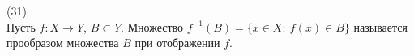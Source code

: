 (31)\\
Пусть $f: X \to Y$, $B \subset Y$. Множество $f^{-1}(B) = \{x\in X:\ f(x) \in B\}$ называется прообразом множества $B$ при отображении $f$.